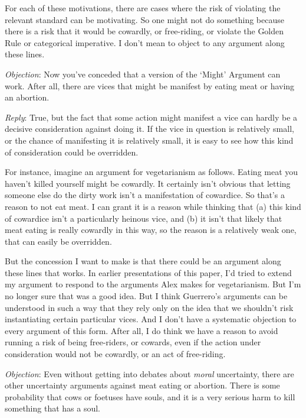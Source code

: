 For each of these motivations, there are cases where the risk of violating the relevant standard can be motivating. So one might not do something because there is a risk that it would be cowardly, or free-riding, or violate the Golden Rule or categorical imperative. I don't mean to object to any argument along these lines.

\emph{Objection}: Now you've conceded that a version of the `Might' Argument can work. After all, there are vices that might be manifest by eating meat or having an abortion.

\emph{Reply}: True, but the fact that some action might manifest a vice can hardly be a decisive consideration against doing it. If the vice in question is relatively small, or the chance of manifesting it is relatively small, it is easy to see how this kind of consideration could be overridden.

For instance, imagine an argument for vegetarianism as follows. Eating meat you haven't killed yourself might be cowardly. It certainly isn't obvious that letting someone else do the dirty work isn't a manifestation of cowardice. So that's a reason to not eat meat. I can grant it is a reason while thinking that (a) this kind of cowardice isn't a particularly heinous vice, and (b) it isn't that likely that meat eating is really cowardly in this way, so the reason is a relatively weak one, that can easily be overridden.

But the concession I want to make is that there could be an argument along these lines that works. In earlier presentations of this paper, I'd tried to extend my argument to respond to the arguments Alex  \citet{Guerrero2007} makes for vegetarianism. But I'm no longer sure that was a good idea. But I think Guerrero's arguments can be understood in such a way that they rely only on the idea that we shouldn't risk instantiating certain particular vices. And I don't have a systematic objection to every argument of this form. After all, I do think we have a reason to avoid running a risk of being free-riders, or cowards, even if the action under consideration would not be cowardly, or an act of free-riding. 

\emph{Objection}: Even without getting into debates about \emph{moral} uncertainty, there are other uncertainty arguments against meat eating or abortion. There is some probability that cows or foetuses have souls, and it is a very serious harm to kill something that has a soul.

